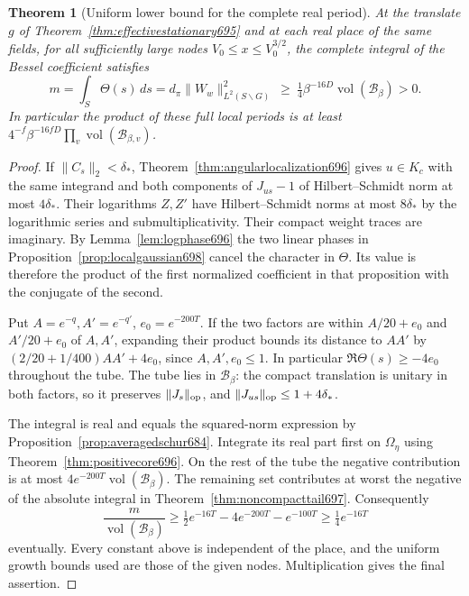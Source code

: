 \documentclass[a4paper,11pt]{article}
\newtheorem{theorem}[proposition]{Theorem}
\theoremstyle{definition}
\theoremstyle{remark}
\numberwithin{equation}{section}
\begin{document}
\begin{theorem}[Uniform lower bound for the complete real period]\leavevmode
\label{thm:fullrealperiod698}
At the translate \(g\) of Theorem~\ref{thm:effectivestationary695}
and at each real place of the same fields, for all sufficiently
large nodes \(V_0\le x\le V_0^{3/2}\), the complete integral
of the Bessel coefficient satisfies
\[
 m=\int_S\Theta(s)\,ds
   =d_\pi\|W_w\|_{L^2(S\backslash G)}^2
   \ \ge\ \tfrac14\beta^{-16D}\operatorname{vol}(\mathcal B_\beta)>0 .
\]
In particular the product of these full local periods is at
least \(4^{-f}\beta^{-16fD}\prod_v\operatorname{vol}(\mathcal B_{\beta,v})\).
\end{theorem}
\begin{proof}
If \(\|C_s\|_2<\delta_*\), Theorem~\ref{thm:angularlocalization696}
gives \(u\in K_c\) with the same integrand and both components
of \(J_{us}-1\) of Hilbert--Schmidt norm at most
\(4\delta_*\). Their logarithms \(Z,Z'\) have
Hilbert--Schmidt norms at most \(8\delta_*\) by the
logarithmic series and submultiplicativity. Their compact
weight traces are imaginary. By Lemma~\ref{lem:logphase696}
the two linear phases in Proposition~\ref{prop:localgaussian698}
cancel the character in \(\Theta\). Its value is therefore
the product of the first normalized coefficient in that
proposition with the conjugate of the second.

Put \(A=e^{-q}, A'=e^{-q'}\), \(e_0=e^{-200T}\).
If the two factors are within \(A/20+e_0\) and
\(A'/20+e_0\) of \(A,A'\), expanding their product bounds
its distance to \(AA'\) by
\((2/20+1/400)AA'+4e_0\), since \(A,A',e_0\le1\).
In particular \(\Re\Theta(s)\ge-4e_0\) throughout the tube.
The tube lies in \(\mathcal B_\beta\): the compact translation
is unitary in both factors, so it preserves \(\|J_s\|_{\rm op}\),
and \(\|J_{us}\|_{\rm op}\le1+4\delta_*\).

The integral is real and equals the squared-norm expression
by Proposition~\ref{prop:averagedschur684}. Integrate its
real part first on \(\Omega_\eta\) using
Theorem~\ref{thm:positivecore696}. On the rest of the tube
the negative contribution is at most
\(4e^{-200T}\operatorname{vol}(\mathcal B_\beta)\). The
remaining set contributes at worst the negative of the
absolute integral in Theorem~\ref{thm:noncompacttail697}.
Consequently
\[
  \frac{m}{\operatorname{vol}(\mathcal B_\beta)}
       \ge \tfrac12 e^{-16T}-4e^{-200T}-e^{-100T}
       \ge \tfrac14 e^{-16T}
\]
eventually. Every constant above is independent of the
place, and the uniform growth bounds used are those of the
given nodes. Multiplication gives the final assertion.
\end{proof}
\end{document}
